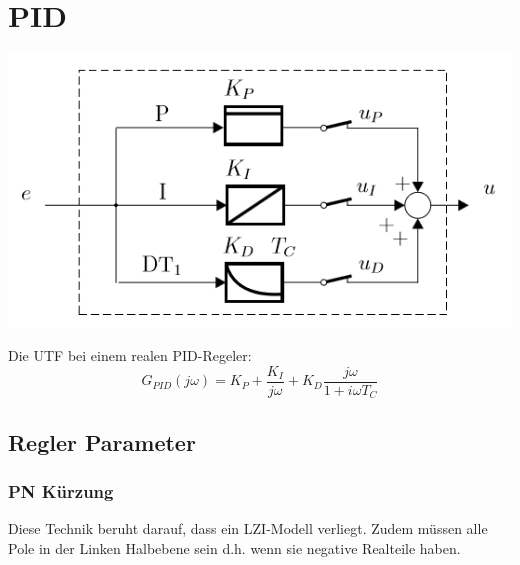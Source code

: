 \section{PID}
\begin{center}
 	\includegraphics[width=\columnwidth]{Images/pid}
\end{center}

Die UTF bei einem realen PID-Regeler:
\[
G_{PID}(j\omega) = K_P + \frac{K_I}{j\omega} + K_D\frac{j\omega}{1+i\omega T_C}
\]

\subsection{Regler Parameter}
\subsubsection{PN Kürzung}
Diese Technik beruht darauf, dass ein LZI-Modell verliegt. Zudem müssen alle Pole in der Linken Halbebene sein d.h. wenn sie negative Realteile haben.

